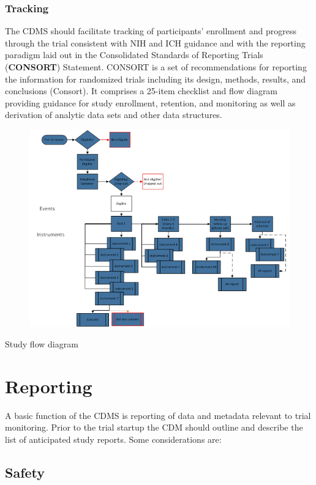 \documentclass[]{book}
\begin{document}
\subsubsection{Tracking}\label{tracking}

The CDMS should facilitate tracking of participants' enrollment and
progress through the trial consistent with NIH and ICH guidance and with
the reporting paradigm laid out in the Consolidated Standards of
Reporting Trials (\textbf{CONSORT}) Statement. CONSORT is a set of
recommendations for reporting the information for randomized trials
including its design, methods, results, and conclusions (Consort). It
comprises a 25-item checklist and flow diagram providing guidance for
study enrollment, retention, and monitoring as well as derivation of
analytic data sets and other data structures.

\begin{figure}[htbp]
\centering
\includegraphics{images/book/dm1.png}
\caption{}
\end{figure}

Study flow diagram

\section{Reporting}\label{reporting}

A basic function of the CDMS is reporting of data and metadata relevant
to trial monitoring. Prior to the trial startup the CDM should outline
and describe the list of anticipated study reports. Some considerations
are:

\subsection{Safety}\label{safety}
\end{document}
